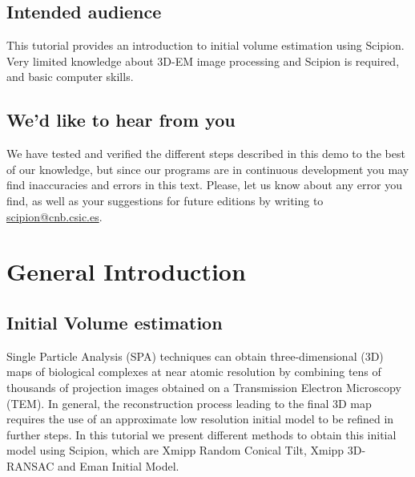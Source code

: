 \documentclass[12pt]{article} %
\begin{document}



\subsection*{Intended audience}

This tutorial provides an introduction to initial volume estimation using Scipion. 
Very limited knowledge about 3D-EM image processing and Scipion is required, and basic computer skills.

\subsection*{We'd like to hear from you}

We have tested and verified the different steps described in this demo
to the best of our knowledge, but since our programs are in continuous
development you may find inaccuracies and errors in this text. Please,
let us know about any error you find, as well as your suggestions for
future editions by writing to
\href{mailto:scipion@cnb.csic.es}{scipion@cnb.csic.es}.

\newpage


\tableofcontents %

\newpage %


\section{General Introduction}

\subsection{Initial Volume estimation}

Single Particle Analysis (SPA) techniques can obtain three-dimensional (3D) maps of biological complexes 
at near atomic resolution by combining tens of thousands of projection images obtained on a 
Transmission Electron Microscopy (TEM). In general, the reconstruction process leading to the final 3D map 
requires the use of an approximate low resolution initial model to be refined in further steps. 
In this tutorial we present different methods to obtain this initial model using Scipion, 
which are Xmipp Random Conical Tilt, Xmipp 3D-RANSAC and Eman Initial Model.
\end{document}
